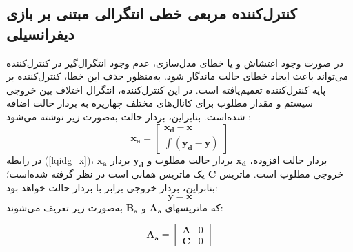 \documentclass{CCI2020}
\begin{document}
\subsection{کنترل‌کننده مربعی خطی انتگرالی مبتنی بر بازی دیفرانسیلی}\label{LQIDG}
در صورت وجود اغتشاش و یا خطای مدل‌سازی، عدم وجود انتگرال‌گیر در کنترل‌کننده
می‌تواند باعث ایجاد خطای حالت ماندگار شود. به‌منظور حذف این خطا، کنترل‌کننده
بر پایه کنترل‌کننده
تعمیم‌یافته است. در این کنترل‌کننده، انتگرال اختلاف بین خروجی سیستم و مقدار مطلوب برای کانال‌های مختلف چهارپره به بردار حالت اضافه شده‌است. بنابراین، بردار حالت به‌صورت زیر نوشته می‌شود
\cite{reza_pordal}:
\begin{equation}\label{lqidg_x}
	\boldsymbol{x_a} = \begin{bmatrix}
		\boldsymbol{x_d} - \boldsymbol{x}\\
		\displaystyle \int (\boldsymbol{y_d} - \boldsymbol{y})
	\end{bmatrix}
\end{equation}
در رابطه
(\ref{lqidg_x})،
$	\boldsymbol{x_a}$
بردار حالت افزوده،
$	\boldsymbol{x_d}$
بردار حالت مطلوب و
$	\boldsymbol{y_d}$
بردار خروجی مطلوب است. ماتریس
$	\boldsymbol{C}$
یک ماتریس همانی است در نظر گرفته شده‌است؛ بنابراین، بردار خروجی برابر با بردار حالت خواهد
بود:
\begin{equation}
	\boldsymbol{y} = \boldsymbol{x}
\end{equation}
که ماتریسهای $\boldsymbol{A_a}$ و $\boldsymbol{B_a}$ به‌صورت زیر تعریف می‌شوند:

\begin{equation}
	\boldsymbol{A_a} = \begin{bmatrix}
		\boldsymbol{A} &0\\
		\boldsymbol{C} & 0
	\end{bmatrix}
\end{equation}
\end{document}
